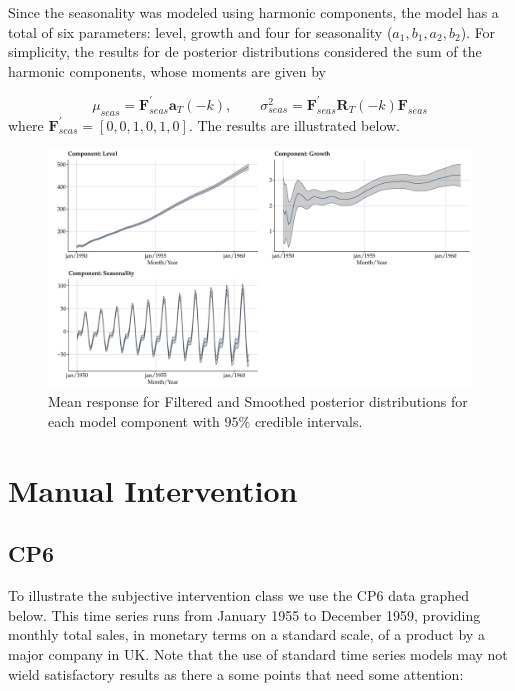 \documentclass[
]{article}
\begin{document}
Since the seasonality was modeled using harmonic components, the model
has a total of six parameters: level, growth and four for seasonality
(\(a_1, b_1, a_2, b_2\)). For simplicity, the results for de posterior
distributions considered the sum of the harmonic components, whose
moments are given by

\[
\mu_{seas} = \mathbf{F}_{seas}^{\prime} \mathbf{a}_T(-k), \quad \quad \sigma^2_{seas} = \mathbf{F}_{seas}^{\prime} \mathbf{R}_T(-k) \mathbf{F}_{seas}
\] where \(\mathbf{F}_{seas}^{\prime} = [0,0,1,0,1, 0]\). The results
are illustrated below.

\begin{figure}

{\centering \includegraphics[width=0.9\linewidth]{pybats_detection_files/figure-latex/components for airpassangers example-1} 

}

\caption{Mean response for Filtered and Smoothed posterior distributions for each model component with $95\%$ credible intervals.}\label{fig:components for airpassangers example}
\end{figure}

\hypertarget{manual-intervention}{%
\section{Manual Intervention}\label{manual-intervention}}

\hypertarget{cp6}{%
\subsection{CP6}\label{cp6}}

To illustrate the subjective intervention class we use the CP6 data
graphed below. This time series runs from January 1955 to December 1959,
providing monthly total sales, in monetary terms on a standard scale, of
a product by a major company in UK. Note that the use of standard time
series models may not wield satisfactory results as there a some points
that need some attention:
\end{document}
